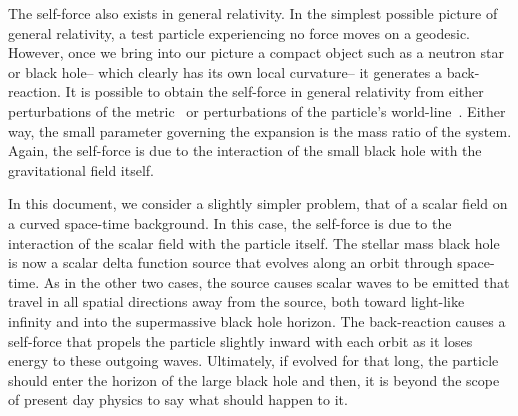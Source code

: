 The self-force also exists in general relativity. In the simplest possible picture of general relativity, a test particle experiencing no force moves on a geodesic. However, once we bring into our picture a compact object such as a neutron star or black hole-- which clearly has its own local curvature-- it generates a back-reaction. It is possible to obtain the self-force in general relativity from either perturbations of the metric~\cite{pound2ndOrderSelfForce2} or perturbations of the particle's world-line~\cite{WardellSelfForceReview}. Either way, the small parameter governing the expansion is the mass ratio of the system. Again, the self-force is due to the interaction of the small black hole with the gravitational field itself.

In this document, we consider a slightly simpler problem, that of a scalar field on a curved space-time background. In this case, the self-force is due to the interaction of the scalar field with the particle itself. The stellar mass black hole is now a scalar delta function source that evolves along an orbit through space-time. As in the other two cases, the source causes scalar waves to be emitted that travel in all spatial directions away from the source, both toward light-like infinity and into the supermassive black hole horizon. The back-reaction causes a self-force that propels the particle slightly inward with each orbit as it loses energy to these outgoing waves. Ultimately, if evolved for that long, the particle should enter the horizon of the large black hole and then, it is beyond the scope of present day physics to say what should happen to it. 



